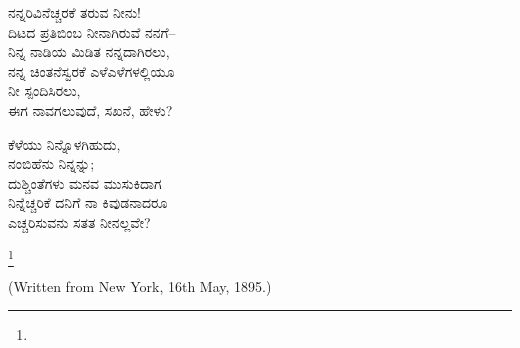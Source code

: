 \begin{myquote}
ನನ್ನರಿವಿನೆಚ್ಚರಕೆ ತರುವ ನೀನು!\\ದಿಟದ ಪ್ರತಿಬಿಂಬ ನೀನಾಗಿರುವೆ ನನಗೆ–\\ನಿನ್ನ ನಾಡಿಯ ಮಿಡಿತ ನನ್ನದಾಗಿರಲು,\\ನನ್ನ ಚಿಂತನೆಸ್ವರಕೆ ಎಳೆಎಳೆಗಳಲ್ಲಿಯೂ\\ನೀ ಸ್ಪಂದಿಸಿರಲು,\\ಈಗ ನಾವಗಲುವುದೆ, ಸಖನೆ, ಹೇಳು?
\end{myquote}

\begin{myquote}
ಕೆಳೆಯು ನಿನ್ನೊಳಗಿಹುದು,\\ನಂಬಿಹೆನು ನಿನ್ನನ್ನು;\\ದುಶ್ಚಿಂತೆಗಳು ಮನವ ಮುಸುಕಿದಾಗ\\ನಿನ್ನೆಚ್ಚರಿಕೆ ದನಿಗೆ ನಾ ಕಿವುಡನಾದರೂ\\ಎಚ್ಚರಿಸುವನು ಸತತ ನೀನಲ್ಲವೇ?
\end{myquote}

\protect\footnote{}

\begin{center}
(Written from New York, 16th May, 1895.)
\end{center}

\begin{myquote}
\end{myquote}

\begin{myquote}
\end{myquote}

\begin{myquote}
\end{myquote}

